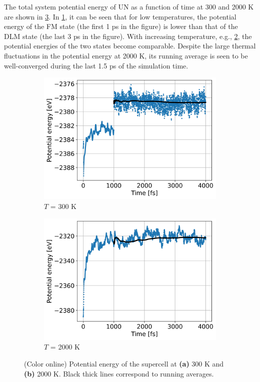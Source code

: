 \documentclass[preprint, 12pt]{elsarticle}
\newcommand{\?}{\stackrel{?}{=}}
\begin{document}
The total system potential energy of UN as a function of time at 300 and 2000 K are shown in \cref{fig:PE}. In \cref{Fig:300-PE}, it can be seen that for low temperatures, the potential energy of the FM state (the first 1 ps in the figure) is lower than that of the DLM state (the last 3 ps in the figure). With increasing temperature, e.g., \cref{Fig:2000-PE}, the potential energies of the two states become comparable. Despite the large thermal fluctuations in the potential energy at 2000 K, its running average is seen to be well-converged during the last 1.5 ps of the simulation time.

\begin{figure}[h!]
\centering
\begin{subfigure}{0.48\textwidth}
    \includegraphics[width=\textwidth]{300-PE.png}
    \caption{$T$ = 300 K}
    \label{Fig:300-PE}
\end{subfigure}
\hfill
\begin{subfigure}{0.48\textwidth}
    \includegraphics[width=\textwidth]{2000-PE.png}
    \caption{$T$ = 2000 K}
    \label{Fig:2000-PE}
\end{subfigure}
\caption{(Color online) Potential energy of the supercell at \textbf{(a)} 300 K and \textbf{(b)} 2000 K. Black thick lines correspond to running averages.}
\label{fig:PE}
\end{figure}
\end{document}

